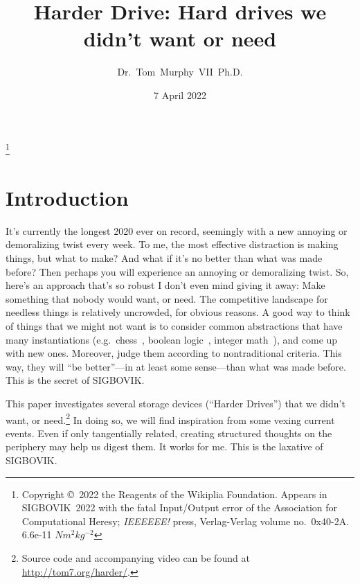 \documentclass[twocolumn]{article}
\begin{document}
\title{Harder Drive: Hard drives we didn't want or need}
\author{Dr.~Tom~Murphy~VII~Ph.D.}\thanks{
Copyright \copyright\ 2022 the Reagents of the Wikiplia Foundation.
Appears in SIGBOVIK~2022 with the
fatal Input/Output error of the Association for Computational Heresy; {\em IEEEEEE!}
press, Verlag-Verlag volume no.~0x40-2A. 6.6e-11 $N m^2kg^{-2}$
}

\renewcommand\th{\ensuremath{{}^{\textrm{th}}}}
\newcommand\st{\ensuremath{{}^{\textrm{st}}}}
\newcommand\rd{\ensuremath{{}^{\textrm{rd}}}}
\newcommand\nd{\ensuremath{{}^{\textrm{nd}}}}

\renewcommand\paragraph[1]{\smallskip \noindent{\bf #1}\enspace}

\date{7 April 2022}

\maketitle \thispagestyle{empty}

\sloppypar


\section{Introduction}

It's currently the longest 2020 ever on record, seemingly with a new
annoying or demoralizing twist every week. To me, the most effective
distraction is making things, but what to make? And what if it's no
better than what was made before? Then perhaps you will experience an
annoying or demoralizing twist. So, here's an approach that's so
robust I don't even mind giving it away: Make something that nobody
would want, or need. The competitive landscape for needless things is
relatively uncrowded, for obvious reasons. A good way to think of
things that we might not want is to consider common abstractions that
have many instantiations (e.g.~chess~\cite{murphy2019eloworld},
boolean logic~\cite{murphy2019nan}, integer
math~\cite{mccann2018fluint}), and come up with new ones. Moreover,
judge them according to nontraditional criteria. This way, they will
``be better''---in at least some sense---than what was made before.
This is the secret of SIGBOVIK.

This paper investigates several storage devices (``Harder Drives'')
that we didn't want, or need.\footnote{ Source code and accompanying
  video can be found at \url{http://tom7.org/harder/}. } In
doing so, we will find inspiration from some vexing current events.
Even if only tangentially related, creating structured thoughts on the
periphery may help us digest them. It works for me. This is the
laxative of SIGBOVIK.
\end{document}
